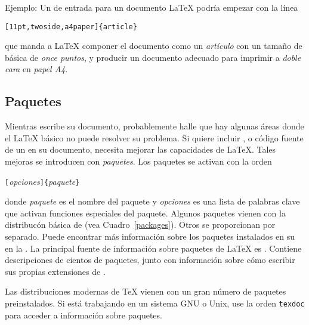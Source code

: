 Ejemplo:  Un \filenomo{} de entrada para un documento \LaTeX{} podría empezar con la línea
\begin{code}
\verb|[11pt,twoside,a4paper]{article}|
\end{code}
que manda a \LaTeX{} componer el documento como un \emph{artículo} con un tamaño de \fontnomo{} básica de \emph{once puntos}, y producir un documento adecuado para imprimir a \emph{doble cara} en \emph{papel A4}.
\pagebreak[2]

\subsection{Paquetes}

Mientras escribe su documento, probablemente halle que hay algunas áreas donde el \LaTeX{} básico no puede resolver su problema.  Si quiere incluir ,  o código fuente de un \filenomo{} en su documento, necesita mejorar las capacidades de \LaTeX.  Tales mejoras se introducen con \emph{paquetes}.  Los paquetes se activan con la orden
\begin{lscommand}
\verb|[|\emph{opciones}\verb|]{|\emph{paquete}\verb|}|
\end{lscommand}
donde \emph{paquete} es el nombre del paquete y \emph{opciones} es una lista de palabras clave que activan funciones especiales del paquete.  Algunos paquetes vienen con la distribucón básica de \LaTeXe{} (vea Cuadro~\ref{packages}).  Otros se proporcionan por separado.  Puede encontrar más información sobre los paquetes instalados en su \computernomo{} en la \guide.  La principal fuente de información sobre paquetes de \LaTeX{} es \companion.  Contiene descripciones de cientos de paquetes, junto con información sobre cómo escribir sus propias extensiones de \LaTeXe.

Las distribuciones modernas de \TeX{} vienen con un gran número de paquetes preinstalados.  Si está trabajando en un sistema GNU o Unix, use la orden \texttt{texdoc} para acceder a información sobre paquetes.

